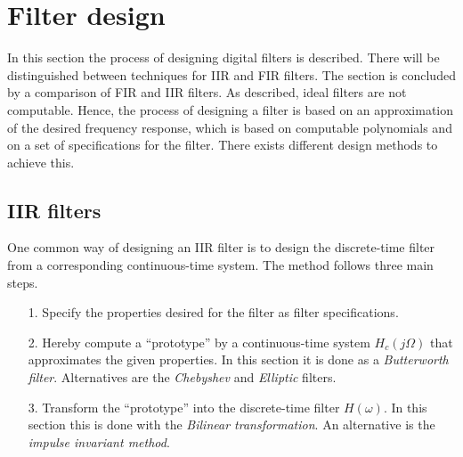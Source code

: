 \section{Filter design}
In this section the process of designing digital filters is described. There will be distinguished between techniques for IIR and FIR filters. The section is concluded by a comparison of FIR and IIR filters. As described, ideal filters are not computable. Hence, the process of designing a filter is based on an approximation of the desired frequency response, which is based on computable polynomials and on a set of specifications for the filter. There exists different design methods to achieve this.

\subsection{IIR filters}
One common way of designing an IIR filter is to design the discrete-time filter from a corresponding continuous-time system. The method follows three main steps. 
\begin{itemize}
\item[1.] Specify the properties desired for the filter as filter specifications.
\item[2.] Hereby compute a ``prototype'' by a continuous-time system $H_c(j\Omega)$ that approximates the given properties. In this section it is done as a \textit{Butterworth filter}. Alternatives are the \textit{Chebyshev} and \textit{Elliptic} filters.
\item[3.] Transform the ``prototype'' into the discrete-time filter $H(\omega)$. In this section this is done with the \textit{Bilinear transformation}. An alternative is the \textit{impulse invariant method}.
\end{itemize}

